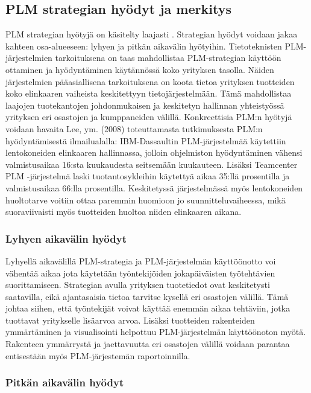 \subsection{PLM strategian hyödyt ja merkitys} \label{PLM strategian hyödyt}

PLM strategian hyötyjä on käsitelty laajasti \cite{alemanni_key_2008} \cite{rivest_product_2012}. Strategian hyödyt voidaan jakaa kahteen osa-alueeseen: lyhyen ja pitkän aikavälin hyötyihin. Tietoteknisten PLM-järjestelmien tarkoituksena on taas mahdollistaa PLM-strategian käyttöön ottaminen ja hyödyntäminen käytännössä koko yrityksen tasolla. Näiden järjestelmien pääasiallisena tarkoituksena on koota tietoa yrityksen tuotteiden koko elinkaaren vaiheista keskitettyyn tietojärjestelmään. Tämä mahdollistaa laajojen tuotekantojen johdonmukaisen ja keskitetyn hallinnan yhteistyössä yrityksen eri osastojen ja kumppaneiden välillä.
Konkreettisia PLM:n hyötyjä voidaan havaita Lee, ym. (2008) toteuttamasta tutkimuksesta PLM:n hyödyntämisestä ilmailualalla: IBM-Dassaultin PLM-järjestelmää käytettiin lentokoneiden elinkaaren hallinnassa, jolloin ohjelmiston hyödyntäminen vähensi valmistusaikaa 16:sta kuukaudesta seitsemään kuukauteen. Lisäksi Teamcenter PLM -järjestelmä laski tuotantosykleihin käytettyä aikaa 35:llä prosentilla ja valmistusaikaa 66:lla prosentilla. Keskitetyssä järjestelmässä myös lentokoneiden huoltotarve voitiin ottaa paremmin huomioon jo suunnitteluvaiheessa, mikä suoraviivaisti myös tuotteiden huoltoa niiden elinkaaren aikana. \cite{lee_product_2008}

\subsubsection{Lyhyen aikavälin hyödyt} \label{Lyhyen aikavälin hyödyt}

Lyhyellä aikavälillä PLM-strategia ja PLM-järjestelmän käyttöönotto voi vähentää aikaa jota käytetään työntekijöiden jokapäiväisten työtehtävien suorittamiseen. Strategian avulla yrityksen tuotetiedot ovat keskitetysti saatavilla, eikä ajantasaisia tietoa tarvitse kysellä eri osastojen välillä. Tämä johtaa siihen, että työntekijät voivat käyttää enemmän aikaa tehtäviin, jotka tuottavat yritykselle lisäarvoa arvoa. Lisäksi tuotteiden rakenteiden ymmärtäminen ja visualisointi helpottuu PLM-järjestelmän käyttöönoton myötä. Rakenteen ymmärrystä ja jaettavuutta eri osastojen välillä voidaan parantaa entisestään myös PLM-järjestemän raportoinnilla. \cite{alemanni_key_2008}

\subsubsection{Pitkän aikavälin hyödyt} \label{Pitkän aikavälin hyödyt}


